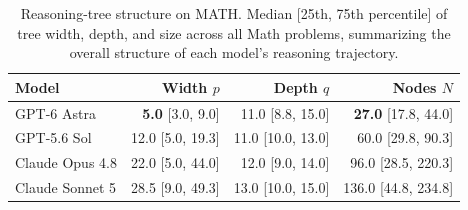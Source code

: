 \begin{table}[t]
\centering
\caption{Reasoning-tree structure on MATH.
Median [25th, 75th percentile] of tree width, depth, and size across all Math problems, summarizing the overall structure of each model's reasoning trajectory.}
\label{tab:reasoning-tree-structure}
\small
\setlength{\tabcolsep}{5pt}
\begin{tabular}{@{}lrrr@{}}
\toprule
Model & Width $p$ & Depth $q$ & Nodes $N$ \\
\midrule
GPT-6 Astra & \textbf{5.0} {\scriptsize [3.0, 9.0]} & 11.0 {\scriptsize [8.8, 15.0]} & \textbf{27.0} {\scriptsize [17.8, 44.0]} \\
GPT-5.6 Sol & 12.0 {\scriptsize [5.0, 19.3]} & 11.0 {\scriptsize [10.0, 13.0]} & 60.0 {\scriptsize [29.8, 90.3]} \\
Claude Opus 4.8 & 22.0 {\scriptsize [5.0, 44.0]} & 12.0 {\scriptsize [9.0, 14.0]} & 96.0 {\scriptsize [28.5, 220.3]} \\
Claude Sonnet 5 & 28.5 {\scriptsize [9.0, 49.3]} & 13.0 {\scriptsize [10.0, 15.0]} & 136.0 {\scriptsize [44.8, 234.8]} \\
\bottomrule
\end{tabular}
\end{table}
